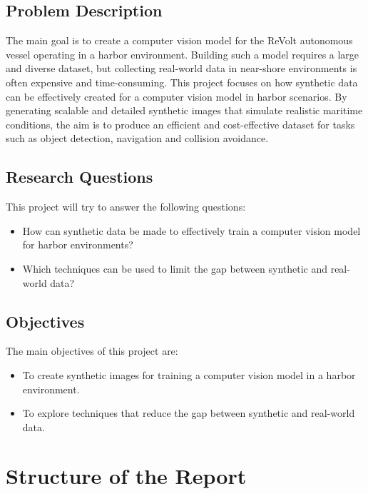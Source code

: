 \subsection{Problem Description}
The main goal is to create a computer vision model for the ReVolt autonomous vessel operating in a harbor environment. Building such a model requires a large and diverse dataset, but collecting real-world data in near-shore environments is often expensive and time-consuming. This project focuses on how synthetic data can be effectively created for a computer vision model in harbor scenarios. By generating scalable and detailed synthetic images that simulate realistic maritime conditions, the aim is to produce an efficient and cost-effective dataset for tasks such as object detection, navigation and collision avoidance.

\subsection{Research Questions}
This project will try to answer the following questions:
\begin{itemize}
    \item How can synthetic data be made to effectively train a computer vision model for harbor environments?
    \item Which techniques can be used to limit the gap between synthetic and real-world data?
    
\end{itemize}

\subsection{Objectives}
The main objectives of this project are:
\begin{itemize}
    \item To create synthetic images for training a computer vision model in a harbor environment.
    \item To explore techniques that reduce the gap between synthetic and real-world data.
\end{itemize}


\section{Structure of the Report}

